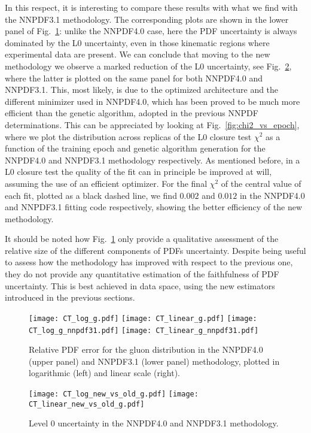 In this respect, it is interesting to compare these results with what we find
with the NNPDF3.1 methodology. The corresponding plots are shown in the lower panel of
Fig.~\ref{fig:CT_uncertainty_g}: unlike the NNPDF4.0 case, here the PDF
uncertainty is always dominated by the L0 uncertainty, even in those kinematic
regions where experimental data are present. We can conclude that moving to the
new methodology we observe a marked reduction of the L0 uncertainty, 
see Fig.~\ref{fig:CT_uncertainty_new_vs_old}, where the latter is plotted on the same panel
for both NNPDF4.0 and NNPDF3.1. This, most
likely, is due to the optimized architecture and the different minimizer used in
NNPDF4.0, which has been proved to be much more efficient than the genetic
algorithm, adopted in the previous NNPDF determinations. This can be appreciated
by looking at Fig.~\ref{fig:chi2_vs_epoch}, where we plot the distribution
across replicas of the L0 closure test $\chi^2$
as a function of the training epoch and genetic algorithm generation
for the NNPDF4.0 and NNPDF3.1 methodology respectively. As mentioned before, in a L0
closure test the quality of the fit can in principle be improved at will,
assuming the use of an efficient optimizer. For the final $\chi^2$ of the
central value of each fit, plotted as a black dashed line, we find $0.002$ and
$0.012$ in the NNPDF4.0 and NNPDF3.1 fitting code respectively, showing the better
efficiency of the new methodology. 

It should be noted how
Fig.~\ref{fig:CT_uncertainty_g}  only
provide a qualitative assessment of the relative size of the different
components of PDFs uncertainty. Despite being useful to assess how the
methodology has improved with respect to the previous one, they do not provide
any quantitative estimation of the faithfulness of PDF uncertainty. This is best
achieved in data space, using the new estimators introduced in the previous
sections.

\begin{figure}[h]
    \centering
    \texttt{[image: CT\_log\_g.pdf]}
    \texttt{[image: CT\_linear\_g.pdf]}
    \texttt{[image: CT\_log\_g\_nnpdf31.pdf]}
    \texttt{[image: CT\_linear\_g\_nnpdf31.pdf]}
    \caption{Relative PDF error for the gluon distribution in the NNPDF4.0 (upper panel)
    and NNPDF3.1 (lower panel) methodology, plotted in logarithmic (left) and linear scale (right).}
    \label{fig:CT_uncertainty_g}    
\end{figure}

\begin{figure}[h]
    \centering
    \texttt{[image: CT\_log\_new\_vs\_old\_g.pdf]}
    \texttt{[image: CT\_linear\_new\_vs\_old\_g.pdf]}
    \caption{Level 0 uncertainty in the NNPDF4.0 and NNPDF3.1 methodology.}
    \label{fig:CT_uncertainty_new_vs_old}    
\end{figure}

